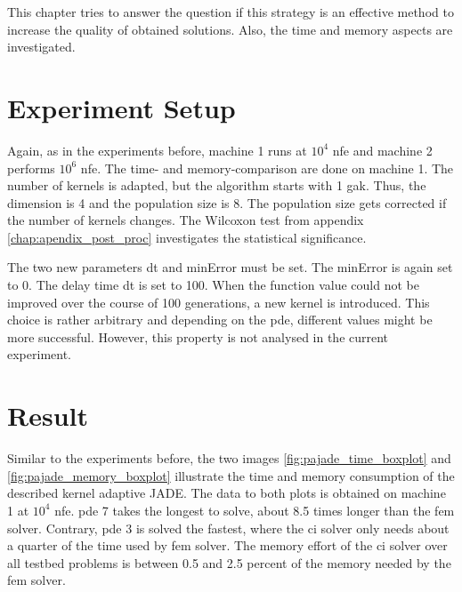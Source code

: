 \documentclass[./\jobname.tex]{subfiles}
\begin{document}
This chapter tries to answer the question if this strategy is an effective method to increase the quality of obtained solutions. Also, the time and memory aspects are investigated. 

\section{Experiment Setup}

Again, as in the experiments before, machine 1 runs at $10^4$ \gls{nfe} and machine 2 performs $10^6$ \gls{nfe}. The time- and memory-comparison are done on machine 1. The number of kernels is adapted, but the algorithm starts with 1 \gls{gak}. Thus, the dimension is 4 and the population size is 8. The population size gets corrected if the number of kernels changes. The Wilcoxon test from appendix \ref{chap:apendix_post_proc} investigates the statistical significance. 

The two new parameters \gls{dt} and minError must be set. The minError is again set to 0. The delay time \gls{dt} is set to 100. When the function value could not be improved over the course of 100 generations, a new kernel is introduced. This choice is rather arbitrary and depending on the \gls{pde}, different values might be more successful. However, this property is not analysed in the current experiment.

\section{Result}
\label{chap:results_ex2}

Similar to the experiments before, the two images \ref{fig:pajade_time_boxplot} and \ref{fig:pajade_memory_boxplot} illustrate the time and memory consumption of the described kernel adaptive JADE. The data to both plots is obtained on machine 1 at $10^4$ \gls{nfe}. \gls{pde} 7 takes the longest to solve, about 8.5 times longer than the \gls{fem} solver. Contrary, \gls{pde} 3 is solved the fastest, where the \gls{ci} solver only needs about a quarter of the time used by \gls{fem} solver. The memory effort of the \gls{ci} solver over all testbed problems is between 0.5 and 2.5 percent of the memory needed by the \gls{fem} solver. 
\end{document}
